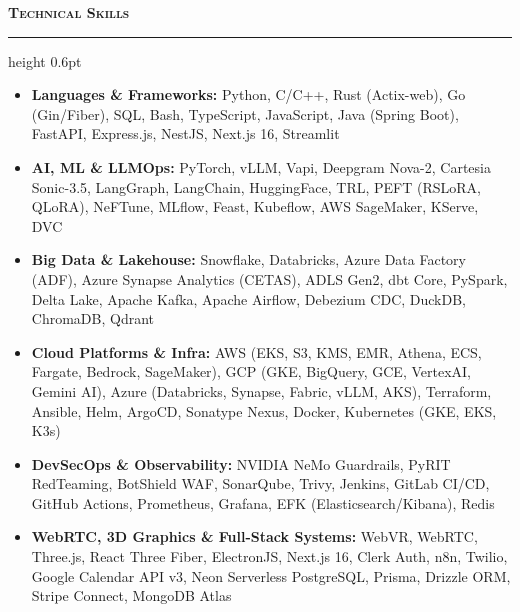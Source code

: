 \documentclass[9.5pt,a4paper]{article}
\newcommand{\resumesection}[1]{%
    \vspace{4.0pt}%
    {\color{burgundy}\scshape\bfseries\fontsize{10.0pt}{11.2pt}\selectfont #1}%
    \vspace{1.0pt}%
    \hrule height 0.6pt\relax%
    \vspace{2.5pt}%
}
\begin{document}
\resumesection{Technical Skills}
\begin{itemize}
    \item \textbf{Languages \& Frameworks:} Python, C/C++, Rust (Actix-web), Go (Gin/Fiber), SQL, Bash, TypeScript, JavaScript, Java (Spring Boot), FastAPI, Express.js, NestJS, Next.js 16, Streamlit
    \item \textbf{AI, ML \& LLMOps:} PyTorch, vLLM, Vapi, Deepgram Nova-2, Cartesia Sonic-3.5, LangGraph, LangChain, HuggingFace, TRL, PEFT (RSLoRA, QLoRA), NeFTune, MLflow, Feast, Kubeflow, AWS SageMaker, KServe, DVC
    \item \textbf{Big Data \& Lakehouse:} Snowflake, Databricks, Azure Data Factory (ADF), Azure Synapse Analytics (CETAS), ADLS Gen2, dbt Core, PySpark, Delta Lake, Apache Kafka, Apache Airflow, Debezium CDC, DuckDB, ChromaDB, Qdrant
    \item \textbf{Cloud Platforms \& Infra:} AWS (EKS, S3, KMS, EMR, Athena, ECS, Fargate, Bedrock, SageMaker), GCP (GKE, BigQuery, GCE, VertexAI, Gemini AI), Azure (Databricks, Synapse, Fabric, vLLM, AKS), Terraform, Ansible, Helm, ArgoCD, Sonatype Nexus, Docker, Kubernetes (GKE, EKS, K3s)
    \item \textbf{DevSecOps \& Observability:} NVIDIA NeMo Guardrails, PyRIT RedTeaming, BotShield WAF, SonarQube, Trivy, Jenkins, GitLab CI/CD, GitHub Actions, Prometheus, Grafana, EFK (Elasticsearch/Kibana), Redis
    \item \textbf{WebRTC, 3D Graphics \& Full-Stack Systems:} WebVR, WebRTC, Three.js, React Three Fiber, ElectronJS, Next.js 16, Clerk Auth, n8n, Twilio, Google Calendar API v3, Neon Serverless PostgreSQL, Prisma, Drizzle ORM, Stripe Connect, MongoDB Atlas
\end{itemize}
\end{document}
